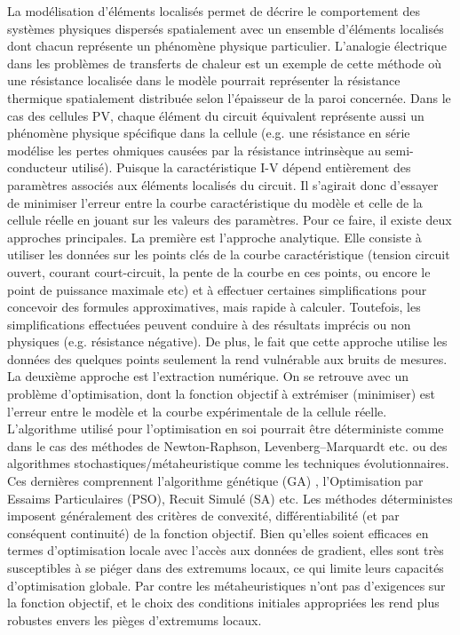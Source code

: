 La modélisation d'éléments localisés permet de décrire le comportement des systèmes physiques dispersés spatialement avec un ensemble d'éléments localisés dont chacun représente un phénomène physique particulier. L'analogie électrique dans les problèmes de transferts de chaleur est un exemple de cette méthode où une résistance localisée dans le modèle pourrait représenter la résistance thermique spatialement distribuée selon l'épaisseur de la paroi concernée. Dans le cas des cellules PV, chaque élément du circuit équivalent représente aussi un phénomène physique spécifique dans la cellule (e.g. une résistance en série modélise les pertes ohmiques causées par la résistance intrinsèque au semi-conducteur utilisé). Puisque la caractéristique I-V dépend entièrement des paramètres associés aux éléments localisés du circuit. Il s'agirait donc d'essayer de minimiser l'erreur entre la courbe caractéristique du modèle et celle de la cellule réelle en jouant sur les valeurs des paramètres. 
Pour ce faire, il existe deux approches principales. La première est l'approche analytique. Elle consiste à utiliser les données sur les points clés de la courbe caractéristique (tension circuit ouvert, courant court-circuit, la pente de la courbe en ces points, ou encore le point de puissance maximale etc) et à effectuer certaines simplifications pour concevoir des formules approximatives, mais rapide à calculer. Toutefois, les simplifications effectuées peuvent conduire à des résultats imprécis ou non physiques (e.g. résistance négative). De plus, le fait que cette approche utilise les données des quelques points seulement la rend vulnérable aux bruits de mesures. La deuxième approche est l'extraction numérique. On se retrouve avec un problème d'optimisation, dont la fonction objectif à extrémiser (minimiser) est l'erreur entre le modèle et la courbe expérimentale de la cellule réelle. L'algorithme utilisé pour l'optimisation en soi pourrait être déterministe comme dans le cas des méthodes de Newton-Raphson, Levenberg–Marquardt etc. ou des algorithmes stochastiques/métaheuristique comme les techniques évolutionnaires. Ces dernières comprennent l'algorithme génétique (GA) , l'Optimisation par Essaims Particulaires (PSO), Recuit Simulé (SA)  etc. Les méthodes déterministes imposent généralement des critères de convexité, différentiabilité (et par conséquent continuité) de la fonction objectif. Bien qu'elles soient efficaces en termes d'optimisation locale avec l'accès aux données de gradient, elles sont très susceptibles à se piéger dans des extremums locaux, ce qui limite leurs capacités d'optimisation globale. Par contre les métaheuristiques n'ont pas d'exigences sur la fonction objectif, et le choix des conditions initiales appropriées les rend plus robustes envers les pièges d'extremums locaux.

